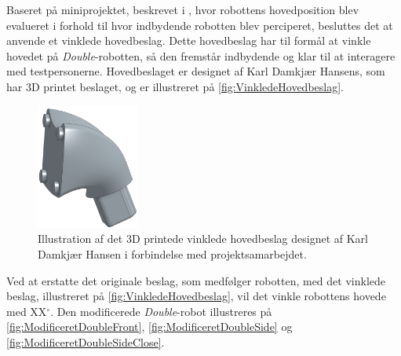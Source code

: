 Baseret på miniprojektet, beskrevet i \fullref{\MiniprojektHovedeVinkelpartname}, hvor robottens hovedposition blev evalueret i forhold til hvor indbydende robotten blev perciperet, besluttes det at anvende et vinklede hovedbeslag. Dette hovedbeslag har til formål at vinkle hovedet på \textit{Double}-robotten, så den fremstår indbydende og klar til at interagere med testpersonerne. Hovedbeslaget er designet af Karl Damkjær Hansens, som har 3D printet beslaget, og er illustreret på \autoref{fig:VinkledeHovedbeslag}.            
%
\begin{figure}[H]
\centering
\includegraphics[width = 0.3\textwidth]{Figure/VinkledeHovedbeslag} 
\caption{Illustration af det 3D printede vinklede hovedbeslag designet af Karl Damkjær Hansen i forbindelse med projektsamarbejdet.}
\label{fig:VinkledeHovedbeslag}
\end{figure}
\noindent
%
Ved at erstatte det originale beslag, som medfølger robotten, med det vinklede beslag, illustreret på \autoref{fig:VinkledeHovedbeslag}, vil det vinkle robottens hovede med XX$^{\circ}$. Den modificerede \textit{Double}-robot illustreres på \autoref{fig:ModificeretDoubleFront}, \autoref{fig:ModificeretDoubleSide} og \autoref{fig:ModificeretDoubleSideClose}.
%
